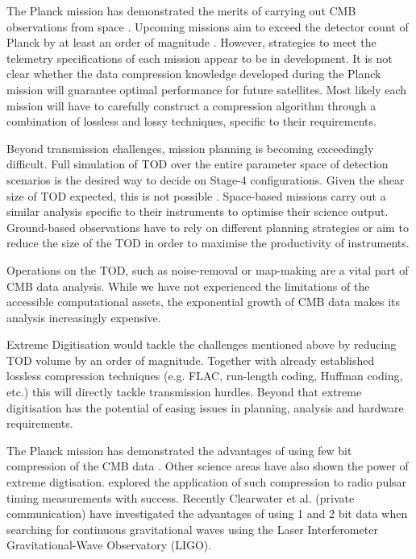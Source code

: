 \documentclass[apj]{emulateapj}
\begin{document}
The Planck mission has demonstrated the merits of carrying out CMB observations from space \citep{planck2018}. Upcoming missions aim to exceed the detector count of Planck by at least an order of magnitude \citep{litebird2014, pixie2011, core2018}. However, strategies to meet the telemetry specifications of each mission appear to be in development. It is not clear whether the data compression knowledge developed during the Planck mission will guarantee optimal performance for future satellites. Most likely each mission will have to carefully construct a compression algorithm through a combination of lossless and lossy techniques, specific to their requirements.


Beyond transmission challenges, mission planning is becoming exceedingly difficult. Full simulation of TOD over the entire parameter space of detection scenarios is the desired way to decide on Stage-4 configurations. Given the shear size of TOD expected, this is not possible \citep{s4sciencebook}. Space-based missions carry out a similar analysis specific to their instruments to optimise their science output. Ground-based observations have to rely on different planning strategies or aim to reduce the size of the TOD in order to maximise the productivity of instruments.


Operations on the TOD, such as noise-removal or map-making are a vital part of CMB data analysis. While we have not experienced the limitations of the accessible computational assets, the exponential growth of CMB data makes its analysis increasingly expensive.


Extreme Digitisation would tackle the challenges mentioned above by reducing TOD volume by an order of magnitude. Together with already established lossless compression techniques (e.g. FLAC, run-length coding, Huffman coding, etc.) this will directly tackle transmission hurdles. Beyond that extreme digitisation has the potential of easing issues in planning, analysis and hardware requirements.

The Planck mission has demonstrated the advantages of using few bit compression of the CMB data \citep{maris2003}. Other science areas have also shown the power of extreme digtisation. \cite{jenet1998} explored the application of such compression to radio pulsar timing measurements with success. Recently Clearwater et al. (private communication) have investigated the advantages of using 1 and 2 bit data when searching for continuous gravitational waves using the Laser Interferometer Gravitational-Wave Observatory (LIGO).
\end{document}
